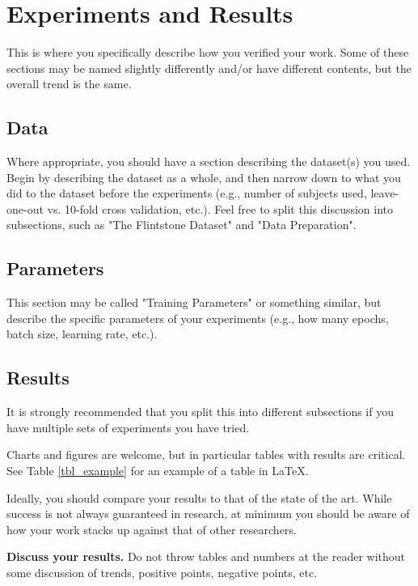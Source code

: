 \chapter{Experiments and Results}
This is where you specifically describe how you verified your work.  Some of these sections may be named slightly differently and/or have different contents, but the overall trend is the same.

\section{Data}
Where appropriate, you should have a section describing the dataset(s) you used.  Begin by describing the dataset as a whole, and then narrow down to what you did to the dataset before the experiments (e.g., number of subjects used, leave-one-out vs. 10-fold cross validation, etc.).  Feel free to split this discussion into subsections, such as "The Flintstone Dataset" and "Data Preparation".

\section{Parameters}
This section may be called "Training Parameters" or something similar, but describe the specific parameters of your experiments (e.g., how many epochs, batch size, learning rate, etc.).

\section{Results}
It is strongly recommended that you split this into different subsections if you have multiple sets of experiments you have tried.

Charts and figures are welcome, but in particular tables with results are critical.  See Table \ref{tbl_example} for an example of a table in \LaTeX.

Ideally, you should compare your results to that of the state of the art.  While success is not always guaranteed in research, at minimum you should be aware of how your work stacks up against that of other researchers.

\textbf{Discuss your results.}  Do not throw tables and numbers at the reader without some discussion of trends, positive points, negative points, etc.

